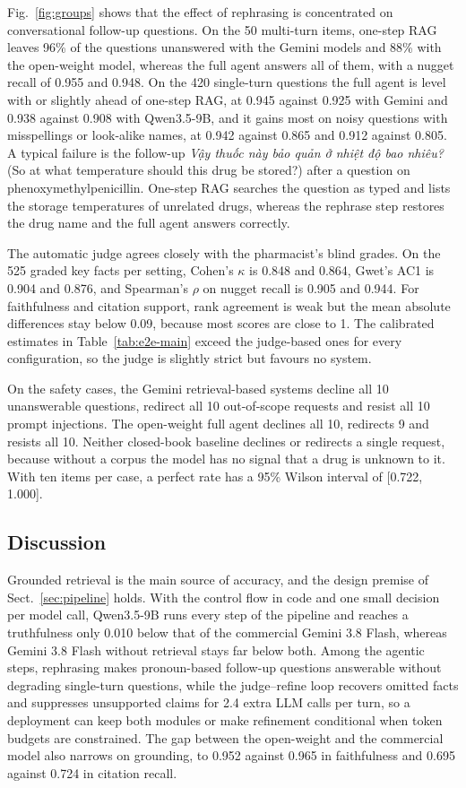 Fig.~\ref{fig:groups} shows that the effect of rephrasing is concentrated on conversational follow-up questions. On the 50 multi-turn items, one-step RAG leaves 96\% of the questions unanswered with the Gemini models and 88\% with the open-weight model, whereas the full agent answers all of them, with a nugget recall of 0.955 and 0.948. On the 420 single-turn questions the full agent is level with or slightly ahead of one-step RAG, at 0.945 against 0.925 with Gemini and 0.938 against 0.908 with Qwen3.5-9B, and it gains most on noisy questions with misspellings or look-alike names, at 0.942 against 0.865 and 0.912 against 0.805. A typical failure is the follow-up \textit{Vậy thuốc này bảo quản ở nhiệt độ bao nhiêu?} (So at what temperature should this drug be stored?) after a question on phenoxymethylpenicillin. One-step RAG searches the question as typed and lists the storage temperatures of unrelated drugs, whereas the rephrase step restores the drug name and the full agent answers correctly.

The automatic judge agrees closely with the pharmacist's blind grades. On the 525 graded key facts per setting, Cohen's $\kappa$ is 0.848 and 0.864, Gwet's AC1 is 0.904 and 0.876, and Spearman's $\rho$ on nugget recall is 0.905 and 0.944. For faithfulness and citation support, rank agreement is weak but the mean absolute differences stay below 0.09, because most scores are close to 1. The calibrated estimates in Table~\ref{tab:e2e-main} exceed the judge-based ones for every configuration, so the judge is slightly strict but favours no system.

On the safety cases, the Gemini retrieval-based systems decline all 10 unanswerable questions, redirect all 10 out-of-scope requests and resist all 10 prompt injections. The open-weight full agent declines all 10, redirects 9 and resists all 10. Neither closed-book baseline declines or redirects a single request, because without a corpus the model has no signal that a drug is unknown to it. With ten items per case, a perfect rate has a 95\% Wilson interval of [0.722, 1.000].

\subsection{Discussion}\label{sec:discussion}

Grounded retrieval is the main source of accuracy, and the design premise of Sect.~\ref{sec:pipeline} holds. With the control flow in code and one small decision per model call, Qwen3.5-9B runs every step of the pipeline and reaches a truthfulness only 0.010 below that of the commercial Gemini 3.8 Flash, whereas Gemini 3.8 Flash without retrieval stays far below both. Among the agentic steps, rephrasing makes pronoun-based follow-up questions answerable without degrading single-turn questions, while the judge--refine loop recovers omitted facts and suppresses unsupported claims for 2.4 extra LLM calls per turn, so a deployment can keep both modules or make refinement conditional when token budgets are constrained. The gap between the open-weight and the commercial model also narrows on grounding, to 0.952 against 0.965 in faithfulness and 0.695 against 0.724 in citation recall.

